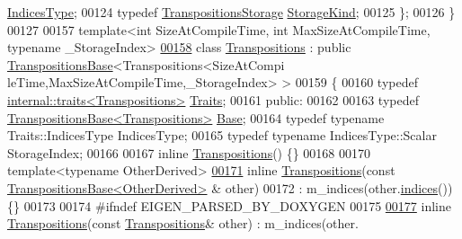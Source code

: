 \begin{DoxyCode}
       \hyperlink{group___core___module_class_eigen_1_1_matrix}{IndicesType};
00124   \textcolor{keyword}{typedef} \hyperlink{struct_eigen_1_1_transpositions_storage}{TranspositionsStorage} \hyperlink{struct_eigen_1_1_permutation_storage}{StorageKind};
00125 \};
00126 \}
00127 
00157 \textcolor{keyword}{template}<\textcolor{keywordtype}{int} SizeAtCompileTime, \textcolor{keywordtype}{int} MaxSizeAtCompileTime, \textcolor{keyword}{typename} \_StorageIndex>
\hyperlink{group___core___module}{00158} \textcolor{keyword}{class }\hyperlink{group___core___module_class_eigen_1_1_transpositions}{Transpositions} : \textcolor{keyword}{public} \hyperlink{class_eigen_1_1_transpositions_base}{TranspositionsBase}<Transpositions<SizeAtCompi
      leTime,MaxSizeAtCompileTime,\_StorageIndex> >
00159 \{
00160     \textcolor{keyword}{typedef} \hyperlink{struct_eigen_1_1internal_1_1traits}{internal::traits<Transpositions>} 
      \hyperlink{struct_eigen_1_1internal_1_1traits}{Traits};
00161   \textcolor{keyword}{public}:
00162 
00163     \textcolor{keyword}{typedef} \hyperlink{class_eigen_1_1_transpositions_base}{TranspositionsBase<Transpositions>} 
      \hyperlink{class_eigen_1_1_transpositions_base}{Base};
00164     \textcolor{keyword}{typedef} \textcolor{keyword}{typename} Traits::IndicesType IndicesType;
00165     \textcolor{keyword}{typedef} \textcolor{keyword}{typename} IndicesType::Scalar StorageIndex;
00166 
00167     \textcolor{keyword}{inline} \hyperlink{group___core___module_class_eigen_1_1_transpositions}{Transpositions}() \{\}
00168 
00170     \textcolor{keyword}{template}<\textcolor{keyword}{typename} OtherDerived>
\hyperlink{group___core___module_aae3eb58072f5b26f3851925eec5a006f}{00171}     \textcolor{keyword}{inline} \hyperlink{group___core___module_aae3eb58072f5b26f3851925eec5a006f}{Transpositions}(\textcolor{keyword}{const} \hyperlink{class_eigen_1_1_transpositions_base}{TranspositionsBase<OtherDerived>}
      & other)
00172       : m\_indices(other.\hyperlink{class_eigen_1_1_transpositions_base_a90acc796341b4627882705d1099e593d}{indices}()) \{\}
00173 
00174 \textcolor{preprocessor}{    #ifndef EIGEN\_PARSED\_BY\_DOXYGEN}
00175 
\hyperlink{group___core___module_ace0b2d83863d5d433846c33292bb868c}{00177}     \textcolor{keyword}{inline} \hyperlink{group___core___module_ace0b2d83863d5d433846c33292bb868c}{Transpositions}(\textcolor{keyword}{const} \hyperlink{group___core___module_class_eigen_1_1_transpositions}{Transpositions}& other) : m\_indices(other.

\end{DoxyCode}
